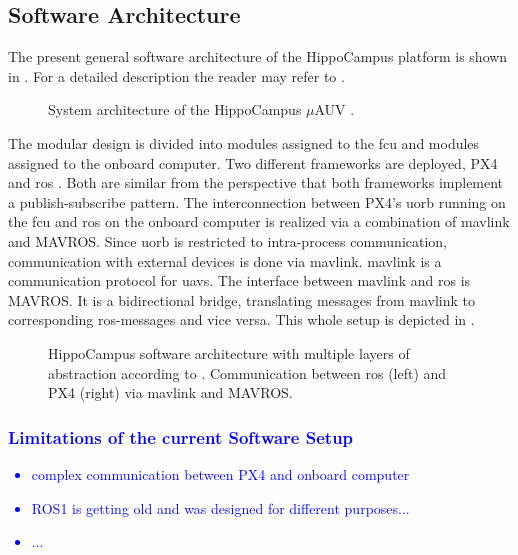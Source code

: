 \subsection{Software Architecture}
The present general software architecture of the HippoCampus platform is shown in . For a detailed description the reader may refer to \cite{duecker-phd}. 
\begin{figure}[h!]
	\centering
     \def\svgwidth{12cm}  
	
	\caption{System architecture of the HippoCampus $\mu$AUV \cite{duecker-phd}.}
    \label{fig:software-architecture-overview}
\end{figure}
The modular design is divided into modules assigned to the \ac{fcu} and modules assigned to the onboard computer.
Two different frameworks are deployed, PX4 \cite{PX4} and \ac{ros} \cite{ros}.
Both are similar from the perspective that both frameworks implement a publish-subscribe pattern.
The interconnection between PX4's \ac{uorb} running on the \ac{fcu} and \ac{ros} on the onboard computer is realized via a combination of \ac{mavlink} \cite{mavlink} and MAVROS.
Since \ac{uorb} is restricted to intra-process communication, communication with external devices is done via \ac{mavlink}.
\ac{mavlink} is a communication protocol for \acp{uav}.
The interface between \ac{mavlink} and \ac{ros} is MAVROS. It is a bidirectional bridge, translating messages from \ac{mavlink} to corresponding \acs{ros}-messages and vice versa. This whole setup is depicted in .
\begin{figure}[h!]
	\centering
    \def\svgwidth{12cm}  
	
	\caption{HippoCampus software architecture with multiple layers of abstraction according to \cite{duecker-phd}. Communication between \acs{ros} (left) and PX4 (right) via \acs{mavlink} and MAVROS.}
    \label{fig:ros-px4-communication}
\end{figure}


\subsubsection{\textcolor{blue}{Limitations of the current Software Setup}}\label{sec:sw_limitatations}

\textcolor{blue}{
\begin{itemize}
    \item complex communication between PX4 and onboard computer
    \item ROS1 is getting old and was designed for different purposes...
    \item...
\end{itemize}
}

